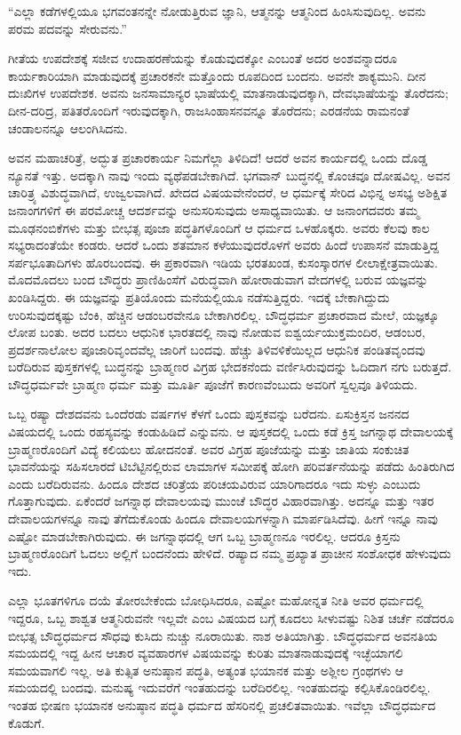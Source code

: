 “ಎಲ್ಲಾ ಕಡೆಗಳಲ್ಲಿಯೂ ಭಗವಂತನನ್ನೇ ನೋಡುತ್ತಿರುವ ಜ್ಞಾನಿ, ಆತ್ಮನನ್ನು ಆತ್ಮನಿಂದ ಹಿಂಸಿಸುವುದಿಲ್ಲ. ಅವನು ಪರಮ ಪದವನ್ನು ಸೇರುವನು.”

ಗೀತೆಯ ಉಪದೇಶಕ್ಕೆ ಸಜೀವ ಉದಾಹರಣೆಯನ್ನು ಕೊಡುವುದಕ್ಕೋ ಎಂಬಂತೆ ಅದರ ಅಂಶವನ್ನಾದರೂ ಕಾರ್ಯಕಾರಿಯಾಗಿ ಮಾಡುವುದಕ್ಕೆ ಪ್ರಚಾರಕನೇ ಮತ್ತೊಂದು ರೂಪದಿಂದ ಬಂದನು. ಅವನೇ ಶಾಕ್ಯಮುನಿ. ದೀನ ದುಃಖಿಗಳ ಉಪದೇಶಕ. ಅವನು ಜನಸಾಮಾನ್ಯರ ಭಾಷೆಯಲ್ಲಿ ಮಾತನಾಡುವುದಕ್ಕಾಗಿ, ದೇವಭಾಷೆಯನ್ನು ತೊರೆದನು; ದೀನ-ದರಿದ್ರ, ಪತಿತರೊಂದಿಗೆ ಇರುವುದಕ್ಕಾಗಿ, ರಾಜಸಿಂಹಾಸನವನ್ನೂ ತೊರೆದನು; ಎರಡನೆಯ ರಾಮನಂತೆ ಚಂಡಾಲನನ್ನೂ ಆಲಂಗಿಸಿದನು.

ಅವನ ಮಹಾಚರಿತ್ರೆ, ಅದ್ಭುತ ಪ್ರಚಾರಕಾರ್ಯ ನಿಮಗೆಲ್ಲಾ ತಿಳಿದಿದೆ! ಆದರೆ ಅವನ ಕಾರ್ಯದಲ್ಲಿ ಒಂದು ದೊಡ್ಡ ನ್ಯೂನತೆ ಇತ್ತು. ಅದಕ್ಕಾಗಿ ನಾವು ಇಂದು ವ್ಯಥೆಪಡಬೇಕಾಗಿದೆ. ಭಗವಾನ್​ ಬುದ್ಧನಲ್ಲಿ ಕೊಂಚವೂ ದೋಷವಿಲ್ಲ. ಅವನ ಚಾರಿತ್ರ್ಯ ವಿಶುದ್ಧವಾಗಿದೆ, ಉಜ್ವಲವಾಗಿದೆ. ಖೇದದ ವಿಷಯವೇನೆಂದರೆ, ಆ ಧರ್ಮಕ್ಕೆ ಸೇರಿದ ವಿಭಿನ್ನ ಅಸಭ್ಯ ಅಶಿಕ್ಷಿತ ಜನಾಂಗಗಳಿಗೆ ಈ ಪರಮೋಚ್ಚ ಆದರ್ಶವನ್ನು ಅನುಸರಿಸುವುದು ಅಸಾಧ್ಯವಾಯಿತು. ಆ ಜನಾಂಗದವರು ತಮ್ಮ ಮೂಢನಂಬಿಕೆಗಳು ಮತ್ತು ಬೀಭತ್ಸ ಪೂಜಾ ಪದ್ಧತಿಗಳೊಂದಿಗೆ ಆ ಧರ್ಮದ ಒಳಹೊಕ್ಕರು. ಅವರು ಕೆಲವು ಕಾಲ ಸಭ್ಯರಾದಂತೆಯೇ ಕಂಡರು. ಆದರೆ ಒಂದು ಶತಮಾನ ಕಳೆಯುವುದರೊಳಗೆ ಅವರು ಹಿಂದೆ ಉಪಾಸನೆ ಮಾಡುತ್ತಿದ್ದ ಸರ್ಪಭೂತಾದಿಗಳು ಹೊರಬಂದವು. ಈ ಪ್ರಕಾರವಾಗಿ ಇಡಿಯ ಭರತಖಂಡ, ಕುಸಂಸ್ಕಾರಗಳ ಲೀಲಾಕ್ಷೇತ್ರವಾಯಿತು. ಮೊದಮೊದಲು ಬಂದ ಬೌದ್ಧರು ಪ್ರಾಣಿಹಿಂಸೆಗೆ ವಿರುದ್ಧವಾಗಿ ಹೋರಾಡುವಾಗ ವೇದಗಳಲ್ಲಿ ಬರುವ ಯಜ್ಞವನ್ನು ಖಂಡಿಸಿದ್ದರು. ಈ ಯಜ್ಞವನ್ನು ಪ್ರತಿಯೊಂದು ಮನೆಯಲ್ಲಿಯೂ ನಡೆಸುತ್ತಿದ್ದರು. ಇದಕ್ಕೆ ಬೇಕಾಗಿದ್ದುದು ಉರಿಸುವುದಕ್ಕಷ್ಟು ಬೆಂಕಿ, ಹೆಚ್ಚಿನ ಆಡಂಬರವೇನೂ ಬೇಕಾಗಿರಲಿಲ್ಲ. ಬೌದ್ಧಧರ್ಮ ಪ್ರಚಾರವಾದ ಮೇಲೆ, ಯಜ್ಞಕ್ಕೂ ಲೋಪ ಬಂತು. ಅದರ ಬದಲು ಆಧುನಿಕ ಭಾರತದಲ್ಲಿ ನಾವು ನೋಡುವ ಐಶ್ವರ್ಯಯುಕ್ತಮಂದಿರ, ಆಡಂಬರ, ಪ್ರದರ್ಶನಾಲೋಲ ಪೂಜಾರಿವೃಂದವೆಲ್ಲ ಜಾರಿಗೆ ಬಂದವು. ಹೆಚ್ಚು ತಿಳಿವಳಿಕೆಯಿಲ್ಲದ ಆಧುನಿಕ ಪಂಡಿತವೃಂದವು ಬರೆದಿರುವ ಪುಸ್ತಕಗಳಲ್ಲಿ ಬುದ್ಧನನ್ನು ಬ್ರಾಹ್ಮಣರ ವಿಗ್ರಹ ಭೇದಕನೆಂದು ವರ್ಣಿಸಿರುವುದನ್ನು ಓದಿದಾಗ ನಗು ಬರುತ್ತದೆ. ಬೌದ್ಧಧರ್ಮವೇ ಬ್ರಾಹ್ಮಣ ಧರ್ಮ ಮತ್ತು ಮೂರ್ತಿ ಪೂಜೆಗೆ ಕಾರಣವೆಂಬುದು ಅವರಿಗೆ ಸ್ವಲ್ಪವೂ ತಿಳಿಯದು.

ಒಬ್ಬ ರಷ್ಯಾ ದೇಶದವನು ಒಂದೆರಡು ವರ್ಷಗಳ ಕೆಳಗೆ ಒಂದು ಪುಸ್ತಕವನ್ನು ಬರೆದನು. ಏಸುಕ್ರಿಸ್ತನ ಜನನದ ವಿಷಯದಲ್ಲಿ ಒಂದು ರಹಸ್ಯವನ್ನು ಕಂಡುಹಿಡಿದೆ ಎನ್ನುವನು. ಆ ಪುಸ್ತಕದಲ್ಲಿ ಒಂದು ಕಡೆ ಕ್ರಿಸ್ತ ಜಗನ್ನಾಥ ದೇವಾಲಯಕ್ಕೆ ಬ್ರಾಹ್ಮಣರೊಂದಿಗೆ ವಿದ್ಯೆ ಕಲಿಯಲು ಹೋದನಂತೆ. ಅವರ ವಿಗ್ರಹ ಪೂಜೆಯನ್ನು ಮತ್ತು ಜಾತಿಯ ಸಂಕುಚಿತ ಭಾವನೆಯನ್ನು ಸಹಿಸಲಾರದೆ ಟಿಬೆಟ್ಟಿನಲ್ಲಿರುವ ಲಾಮಾಗಳ ಸಮೀಪಕ್ಕೆ ಹೋಗಿ ಪರಿವರ್ತನೆಯನ್ನು ಪಡೆದು ಹಿಂತಿರುಗಿದ ಎಂದು ಬರೆದಿರುವನು. ಹಿಂದೂ ದೇಶದ ಚರಿತ್ರೆಯ ಪರಿಚಯವಿರುವ ಯಾರಿಗಾದರೂ ಇದು ಸುಳ್ಳು ಎಂಬುದು ಗೊತ್ತಾಗುವುದು. ಏಕೆಂದರೆ ಜಗನ್ನಾಥ ದೇವಾಲಯವು ಮುಂಚೆ ಬೌದ್ಧರ ವಿಹಾರವಾಗಿತ್ತು. ಅದನ್ನೂ ಮತ್ತು ಇತರ ದೇವಾಲಯಗಳನ್ನೂ ನಾವು ತೆಗೆದುಕೊಂಡು ಹಿಂದೂ ದೇವಾಲಯಗಳನ್ನಾಗಿ ಮಾರ್ಪಡಿಸಿದೆವು. ಹೀಗೆ ಇನ್ನೂ ನಾವು ಎಷ್ಟೋ ಮಾಡಬೇಕಾಗಿರುವುದು. ಈ ಜಗನ್ನಾಥದಲ್ಲಿ ಆಗ ಒಬ್ಬ ಬ್ರಾಹ್ಮಣನೂ ಇರಲಿಲ್ಲ. ಆದರೂ ಕ್ರಿಸ್ತನು ಬ್ರಾಹ್ಮಣರೊಂದಿಗೆ ಓದಲು ಅಲ್ಲಿಗೆ ಬಂದನೆಂದು ಹೇಳಿದೆ. ರಷ್ಯಾದ ನಮ್ಮ ಪ್ರಖ್ಯಾತ ಪ್ರಾಚೀನ ಸಂಶೋಧಕ ಹೇಳುವುದು ಇದು.

ಎಲ್ಲಾ ಭೂತಗಳಿಗೂ ದಯೆ ತೋರಬೇಕೆಂದು ಬೋಧಿಸಿದರೂ, ಎಷ್ಟೋ ಮಹೋನ್ನತ ನೀತಿ ಅವರ ಧರ್ಮದಲ್ಲಿ ಇದ್ದರೂ, ಒಬ್ಬ ಶಾಶ್ವತ ಆತ್ಮನಿರುವನೇ ಇಲ್ಲವೇ ಎಂಬ ವಿಷಯದ ಬಗ್ಗೆ ಕೂದಲು ಸೀಳುವಷ್ಟು ನಿಶಿತ ಚರ್ಚೆ ನಡೆದರೂ ಬೀಭತ್ಸ ಬೌದ್ಧಧರ್ಮದ ಸೌಧವು ಕುಸಿದು ನುಚ್ಚು ನೂರಾಯಿತು. ನಾಶ ಅತಿಯಾಗಿತ್ತು. ಬೌದ್ಧಧರ್ಮದ ಅವನತಿಯ ಸಮಯದಲ್ಲಿ ಇದ್ದ ಹೀನ ಆಚಾರ ವ್ಯವಹಾರಗಳ ವಿಷಯವನ್ನು ಕುರಿತು ಮಾತನಾಡುವುದಕ್ಕೆ ಇಚ್ಛೆಯಾಗಲಿ ಸಮಯವಾಗಲಿ ಇಲ್ಲ. ಅತಿ ಕುತ್ಸಿತ ಅನುಷ್ಠಾನ ಪದ್ಧತಿ, ಅತ್ಯಂತ ಭಯಾನಕ ಮತ್ತು ಅಶ್ಲೀಲ ಗ್ರಂಥಗಳು ಆ ಸಮಯದಲ್ಲಿ ಬಂದವು. ಮನುಷ್ಯ ಇದುವರೆಗೆ ಇಂತಹುದನ್ನು ಬರೆದಿರಲಿಲ್ಲ. ಇಂತಹುದನ್ನು ಕಲ್ಪಿಸಿಕೊಂಡಿರಲಿಲ್ಲ. ಇಂತಹ ಭೀಷಣ ಭಯಾನಕ ಅನುಷ್ಠಾನ ಪದ್ಧತಿ ಧರ್ಮದ ಹೆಸರಿನಲ್ಲಿ ಪ್ರಚಲಿತವಾಯಿತು. ಇವೆಲ್ಲಾ ಬೌದ್ಧಧರ್ಮದ ಕೊಡುಗೆ.

